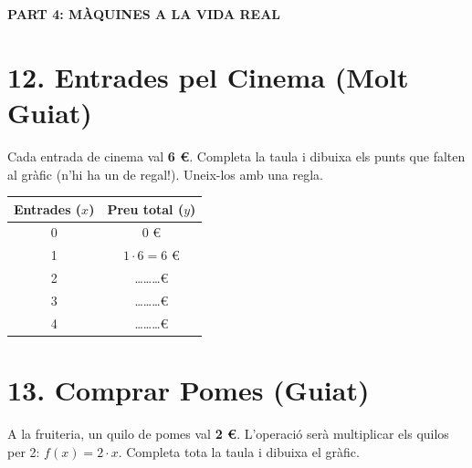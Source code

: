 \documentclass[12pt,a4paper]{article}
\begin{document}
\newpage
\begin{center}
    {\Large \textbf{PART 4: MÀQUINES A LA VIDA REAL}}
\end{center}

\section*{12. Entrades pel Cinema (Molt Guiat)}
Cada entrada de cinema val \textbf{6 €}. 
Completa la taula i dibuixa els punts que falten al gràfic (n'hi ha un de regal!). Uneix-los amb una regla.

\noindent
\begin{minipage}[t]{0.45\textwidth}
    \vspace{0pt}
    \renewcommand{\arraystretch}{1.4}
    \begin{tabular}{|c|c|}
        \hline
        \textbf{Entrades ($x$)} & \textbf{Preu total ($y$)} \\ \hline
        0 & 0 € \\ \hline
        1 & $1 \cdot 6 = 6$ € \\ \hline
        2 & \dots\dots\dots € \\ \hline
        3 & \dots\dots\dots € \\ \hline
        4 & \dots\dots\dots € \\ \hline
    \end{tabular}
\end{minipage}%
\hfill
\begin{minipage}[t]{0.5\textwidth}
    \vspace{0pt}
\end{minipage}

\section*{13. Comprar Pomes (Guiat)}
A la fruiteria, un quilo de pomes val \textbf{2 €}. L'operació serà multiplicar els quilos per 2: $f(x) = 2 \cdot x$. Completa tota la taula i dibuixa el gràfic.
\end{document}
